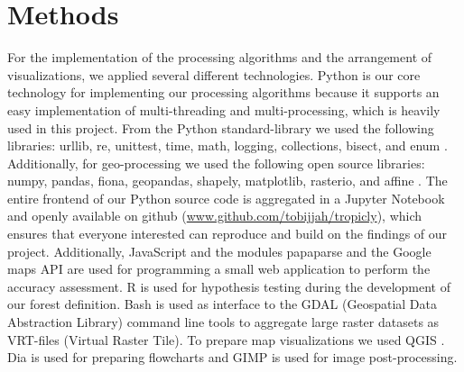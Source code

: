 \section{Methods}
\label{sec:methods}
	For the implementation of the processing algorithms and the arrangement of visualizations, we applied several different technologies. Python is our core technology for implementing our processing algorithms because it supports an easy implementation of multi-threading and multi-processing, which is heavily used in this project. From the Python standard-library we used the following libraries: urllib, re, unittest, time, math, logging, collections, bisect, and enum \citep{Rossum2018}. Additionally, for geo-processing we used the following open source libraries: numpy, pandas, fiona, geopandas, shapely, matplotlib, rasterio, and affine \citep{Hunter2007,McKinney2010,Walt2011,Development2019}. The entire frontend of our Python source code is aggregated in a Jupyter Notebook and openly available on github (\url{www.github.com/tobijjah/tropicly}), which ensures that everyone interested can reproduce and build on the findings of our project. Additionally, JavaScript and the modules papaparse and the Google maps \ac{API} are used for programming a small web application to perform the accuracy assessment. R is used for hypothesis testing during the development of our forest definition. Bash is used as interface to the GDAL (Geospatial Data Abstraction Library) command line tools to aggregate large raster datasets as VRT-files (Virtual Raster Tile). To prepare map visualizations we used QGIS \citep{QGIS2009}. Dia is used for preparing flowcharts and GIMP is used for image post-processing.

